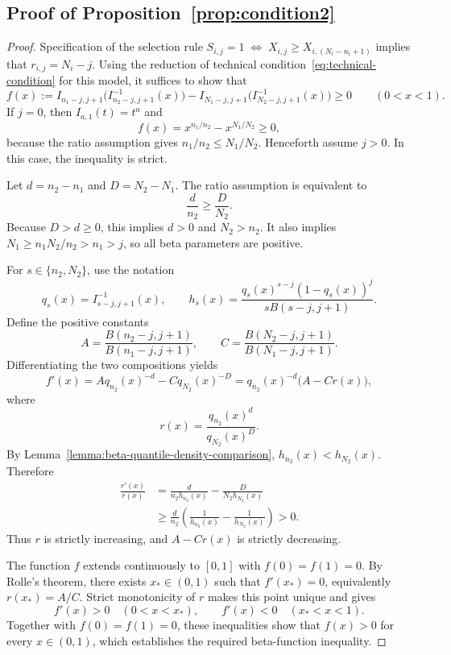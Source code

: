 \documentclass[12pt]{article}
\begin{document}
\subsection{Proof of Proposition~\ref{prop:condition2}}
\begin{proof}
Specification of the selection rule $S_{i,j} = 1 \;\Longleftrightarrow\; X_{i,j} \geq X_{i,(N_i - n_i + 1)}$ implies that $r_{i,j} = N_i - j$. Using the reduction of technical condition~\eqref{eq:technical-condition}
for this model, it suffices to show that
\[
 f(x):=I_{n_1-j,j+1}\bigl(I_{n_2-j,j+1}^{-1}(x)\bigr)
       -I_{N_1-j,j+1}\bigl(I_{N_2-j,j+1}^{-1}(x)\bigr)
 \geq0\qquad(0<x<1).
\]
If $j=0$, then $I_{a,1}(t)=t^a$ and
\[
 f(x)=x^{n_1/n_2}-x^{N_1/N_2}\geq0,
\]
because the ratio assumption gives $n_1/n_2\leq N_1/N_2$.
Henceforth assume $j>0$. In this case, the inequality is strict.

Let $d=n_2-n_1$ and $D=N_2-N_1$. The ratio assumption is equivalent to
\[
 \frac{d}{n_2}\geq\frac{D}{N_2}.
\]
Because $D>d\geq0$, this implies $d>0$ and $N_2>n_2$.
It also implies
$N_1\geq n_1N_2/n_2>n_1>j$, so all beta parameters are positive.

For $s\in\{n_2,N_2\}$, use the notation
\[
 q_s(x)=I_{s-j,j+1}^{-1}(x),
 \qquad
 h_s(x)=\frac{q_s(x)^{s-j}(1-q_s(x))^j}{sB(s-j,j+1)}.
\]
Define the positive constants
\[
 A=\frac{B(n_2-j,j+1)}{B(n_1-j,j+1)},
 \qquad
 C=\frac{B(N_2-j,j+1)}{B(N_1-j,j+1)}.
\]
Differentiating the two compositions yields
\[
 f'(x)=Aq_{n_2}(x)^{-d}-Cq_{N_2}(x)^{-D}
      =q_{n_2}(x)^{-d}\bigl(A-Cr(x)\bigr),
\]
where
\[
 r(x)=\frac{q_{n_2}(x)^d}{q_{N_2}(x)^D}.
\]
By Lemma~\ref{lemma:beta-quantile-density-comparison},
$h_{n_2}(x)<h_{N_2}(x)$. Therefore
\begin{align*}
 \frac{r'(x)}{r(x)}
 &=\frac{d}{n_2h_{n_2}(x)}-\frac{D}{N_2h_{N_2}(x)}\\
 &\geq\frac{d}{n_2}
    \left(\frac1{h_{n_2}(x)}-\frac1{h_{N_2}(x)}\right)>0.
\end{align*}
Thus $r$ is strictly increasing, and $A-Cr(x)$ is strictly decreasing.

The function $f$ extends continuously to $[0,1]$ with
$f(0)=f(1)=0$. By Rolle's theorem, there exists $x_*\in(0,1)$
such that $f'(x_*)=0$, equivalently $r(x_*)=A/C$.
Strict monotonicity of $r$ makes this point unique and gives
\[
 f'(x)>0\quad(0<x<x_*),
 \qquad
 f'(x)<0\quad(x_*<x<1).
\]
Together with $f(0)=f(1)=0$, these inequalities show that
$f(x)>0$ for every $x\in(0,1)$, which establishes the required
beta-function inequality.
\end{proof}
\end{document}

